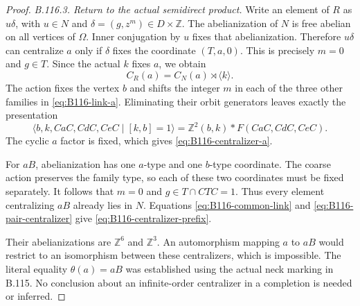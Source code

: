 \begin{proof}
\emph{B.116.3. Return to the actual semidirect product.}
Write an element of $R$ as $u\delta$, with $u\in N$ and
$\delta=(g,z^m)\in D\times\mathbb Z$. The abelianization of $N$
is free abelian on all vertices of $\Omega$. Inner conjugation by
$u$ fixes that abelianization. Therefore $u\delta$ can centralize
$a$ only if $\delta$ fixes the coordinate $(T,a,0)$. This is precisely
$m=0$ and $g\in T$. Since the actual $k$ fixes $a$, we obtain
\[
 C_R(a)=C_N(a)\rtimes\langle k\rangle.
\]
The action fixes the vertex $b$ and shifts the integer $m$ in each
of the three other families in \eqref{eq:B116-link-a}. Eliminating
their orbit generators leaves exactly the presentation
\[
 \langle b,k,CaC,CdC,CeC\mid[k,b]=1\rangle
       =\mathbb Z^2(b,k)*F(CaC,CdC,CeC).
\]
The cyclic $a$ factor is fixed, which gives
\eqref{eq:B116-centralizer-a}.

For $aB$, abelianization has one $a$-type and one $b$-type coordinate.
The coarse action preserves the family type, so each of these two
coordinates must be fixed separately. It follows that $m=0$ and
$g\in T\cap CTC=1$. Thus every element centralizing $aB$ already
lies in $N$. Equations \eqref{eq:B116-common-link} and
\eqref{eq:B116-pair-centralizer} give
\eqref{eq:B116-centralizer-prefix}.

Their abelianizations are $\mathbb Z^6$ and $\mathbb Z^3$.
An automorphism mapping $a$ to $aB$ would restrict to an isomorphism
between these centralizers, which is impossible. The literal equality
$\theta(a)=aB$ was established using the actual neck marking in B.115.
No conclusion about an infinite-order centralizer in a completion is
needed or inferred.
\end{proof}
